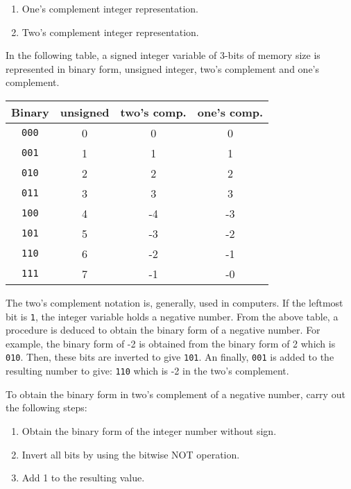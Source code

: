 \begin{enumerate}
\setlength\itemsep{0cm}
\item One's complement integer representation. 
\item Two's complement integer representation.
\end{enumerate}

In the following table, a signed integer variable of 3-bits of memory size is represented in binary form, 
unsigned integer, two's complement and one's complement. 

\begin{center} 
    \begin{tabular}{|c|c|c|c|}
        \hline
        Binary  & unsigned & two's comp.& one's comp.  \\
        \hline
        \texttt{000} & 0 & 0 & 0 \\
        \hline
        \texttt{001} &  1& 1 & 1 \\
        \hline
        \texttt{010} & 2 & 2 & 2 \\
        \hline
        \texttt{011} & 3 & 3 & 3 \\
        \hline
        \texttt{100} & 4 & -4 & -3 \\
        \hline
        \texttt{101} &  5 & -3 & -2 \\
        \hline
        \texttt{110} &  6 & -2 & -1 \\
        \hline
        \texttt{111} &  7 & -1 & -0 \\
        \hline
    \end{tabular}
\end{center} 


The two's complement notation is, generally, used in computers. 
If the leftmost bit is \texttt{1}, the integer variable holds a negative number.
From the above table, a procedure is deduced to obtain the binary form of a negative number. 
For example, the binary form of -2 is obtained from the binary form of 2 which is \texttt{010}. Then, 
these bits are inverted to give \texttt{101}. An finally, \texttt{001} is added to the resulting number to give: 
\texttt{110} which is -2 in the two's complement.

\begin{IN}
   To obtain the binary form in two's complement of a negative number, carry out the following steps: 
   \begin{enumerate}
       \item Obtain the binary form of the integer number without sign. 
       \item Invert all bits by using the bitwise NOT operation. 
       \item Add 1 to the resulting value. 
   \end{enumerate}
\end{IN}

